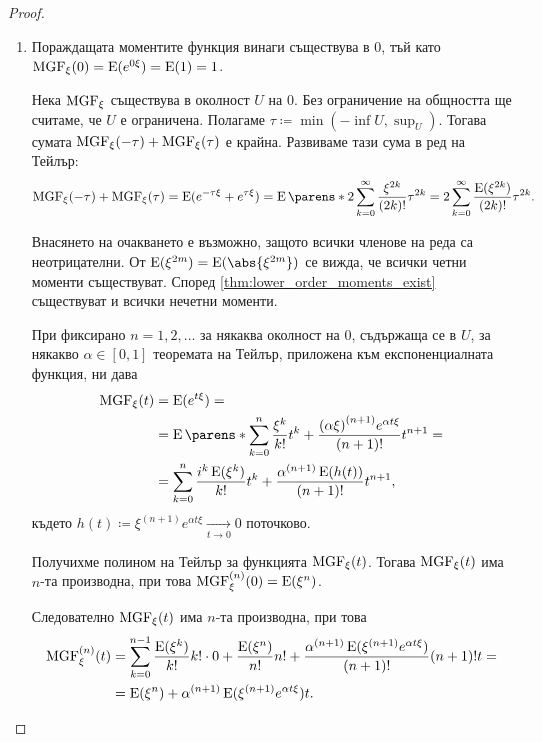 \documentclass{../../common/topic}
\begin{document}
\begin{proof}
  \hfill
  \begin{enumerate}
    \item Пораждащата моментите функция винаги съществува в \( 0 \), тъй като \( \operatorname{MGF}_\xi(0) = \operatorname{E}(e^{0\xi}) = \operatorname{E}(1) = 1 \).

    Нека \( \operatorname{MGF}_\xi \) съществува в околност \( U \) на \( 0 \). Без ограничение на общността ще считаме, че \( U \) е ограничена. Полагаме \( \tau \coloneqq \min(-\inf U, \sup_U) \). Тогава сумата \( \operatorname{MGF}_\xi(-\tau) + \operatorname{MGF}_\xi(\tau) \) е крайна. Развиваме тази сума в ред на Тейлър:
    \begin{equation*}
      \MGF_\xi(-\tau) + \MGF_\xi(\tau)
      =
      \Expect(e^{-\tau\xi} + e^{\tau\xi})
      =
      \Expect\parens*{ 2 \sum_{k=0}^\infty \frac {\xi^{2k}} {(2k)!} \tau^{2k} }
      =
      2 \sum_{k=0}^\infty \frac {\Expect(\xi^{2k})} {(2k)!} \tau^{2k}.
    \end{equation*}

    Внасянето на очакването е възможно, защото всички членове на реда са неотрицателни. От \( \Expect(\xi^{2m}) = \Expect(\abs{\xi^{2m}}) \) се вижда, че всички четни моменти съществуват. Според \cref{thm:lower_order_moments_exist} съществуват и всички нечетни моменти.

    При фиксирано \( n = 1, 2, \ldots \) за някаква околност на \( 0 \), съдържаща се в \( U \), за някакво \( \alpha \in [0, 1] \) теоремата на Тейлър, приложена към експоненциалната функция, ни дава
    \begin{align*}
      \MGF_\xi(t)
      &=
      \Expect(e^{t\xi})
      = \\ &=
      \Expect\parens*{\sum_{k=0}^n \frac {\xi^k} {k!} t^k + \frac {{(\alpha \xi)}^{(n+1)} e^{\alpha t \xi}} {(n+1)!} t^{n+1} }
      = \\ &=
      \sum_{k=0}^n \frac {i^k \Expect(\xi^k)} {k!} t^k + \frac {{\alpha}^{(n+1)} \Expect(h(t))} {(n+1)!} t^{n+1},
    \end{align*}
    където \( h(t) \coloneqq \xi^{(n+1)} e^{\alpha t \xi} \xrightarrow[t \to 0]{} 0 \) поточково.

    Получихме полином на Тейлър за функцията \( \operatorname{MGF}_\xi(t) \). Тогава \( \operatorname{MGF}_\xi(t) \) има \( n \)-та производна, при това \( \operatorname{MGF}^{(n)}_\xi(0) = \operatorname{E}(\xi^n) \).

    Следователно \( \operatorname{MGF}_\xi(t) \) има \( n \)-та производна, при това
    \begin{align*}
      \operatorname{MGF}^{(n)}_\xi(t)
      &=
      \sum_{k=0}^{n-1} \frac {\operatorname{E}(\xi^k)} {k!} k! \cdot 0 + \frac {\operatorname{E}(\xi^n)} {n!} n! + \frac {\alpha^{(n+1)} \operatorname{E}(\xi^{(n+1)} e^{\alpha t \xi})} {(n+1)!} (n+1)! t
      = \\ &=
      \operatorname{E}(\xi^n) + \alpha^{(n+1)} \operatorname{E}(\xi^{(n+1)} e^{\alpha t \xi}) t.
    \end{align*}


\end{enumerate}
\end{proof}
\end{document}
